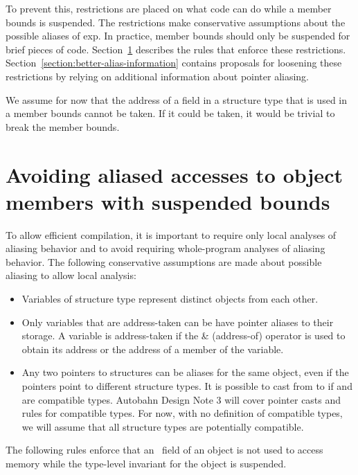 To prevent this, restrictions are placed on what code can do while a
member bounds is suspended. The restrictions make conservative
assumptions about the possible aliases of exp. In practice, member
bounds should only be suspended for brief pieces of code.
Section~\ref{section:avoiding-aliased-accesses}
describes the rules that enforce these restrictions. 
Section~\ref{section:better-alias-information}
contains proposals for loosening these restrictions by relying on
additional information about pointer aliasing.

We assume for now that the address of a field in a structure type that
is used in a member bounds cannot be taken. If it could be taken, it
would be trivial to break the member bounds.

\section{Avoiding aliased accesses to object members with suspended bounds}
\label{section:avoiding-aliased-accesses}

To allow efficient compilation, it is important to require only local
analyses of aliasing behavior and to avoid requiring whole-program
analyses of aliasing behavior. The following conservative assumptions
are made about possible aliasing to allow local analysis:

\begin{itemize}
\item
  Variables of structure type represent distinct objects from each
  other.
\item
  Only variables that are address-taken can be have pointer aliases to
  their storage. A variable is address-taken if the \& (address-of)
  operator is used to obtain its address or the address of a member of
  the variable.
\item
  Any two pointers to structures can be aliases for the same object,
  even if the pointers point to different structure types. It is
  possible to cast from  to
  \ptrT if  and
   are compatible types. Autobahn Design Note 3 will cover
  pointer casts and rules for compatible types. For now, with no
  definition of compatible types, we will assume that all structure
  types are potentially compatible.
\end{itemize}

The following rules enforce that an \arrayptr\ field of an
object is not used to access memory while the type-level invariant for
the object is suspended.

